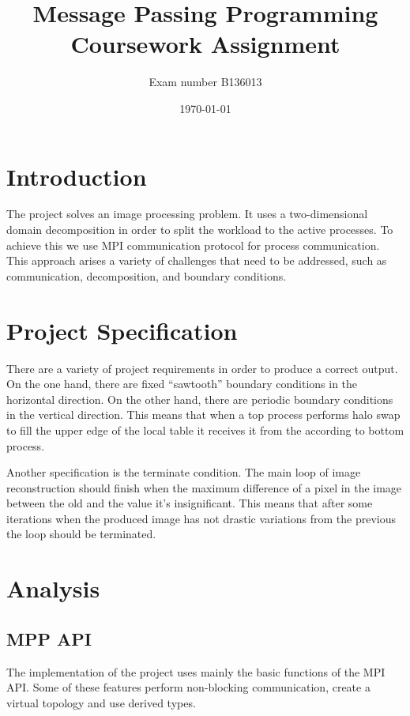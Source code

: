\documentclass[12pt,a4paper]{article}
\newcommand{\sectionVspacing}{\vspace{15pt}}
\begin{document}
\title{Message Passing Programming Coursework Assignment}
\author{Exam number B136013}
\date{\today}

\makeEPCCtitle

\thispagestyle{empty}

\newpage
\clearpage

\tableofcontents

\newpage
\clearpage

\section{Introduction}
The project solves an image processing problem. It uses a two-dimensional domain decomposition in order to split the workload to the active processes. To achieve this we use MPI communication protocol for process communication. This approach arises a variety of challenges that need to be addressed, such as communication, decomposition, and boundary conditions.

\sectionVspacing

\section{Project Specification}
    There are a variety of project requirements in order to produce a correct output. On the one hand, there are fixed “sawtooth” boundary conditions in the horizontal direction. On the other hand, there are periodic boundary conditions in the vertical direction. This means that when a top process performs halo swap to fill the upper edge of the local table it receives it from the according to bottom process.

    Another specification is the terminate condition. The main loop of image reconstruction should finish when the maximum difference of a pixel in the image between the old and the value it's insignificant. This means that after some iterations when the produced image has not drastic variations from the previous the loop should be terminated.

\sectionVspacing

\section{Analysis}

    \subsection{MPP API}
    The implementation of the project uses mainly the basic functions of the MPI API. Some of these features perform non-blocking communication, create a virtual topology and use derived types.
\end{document}
